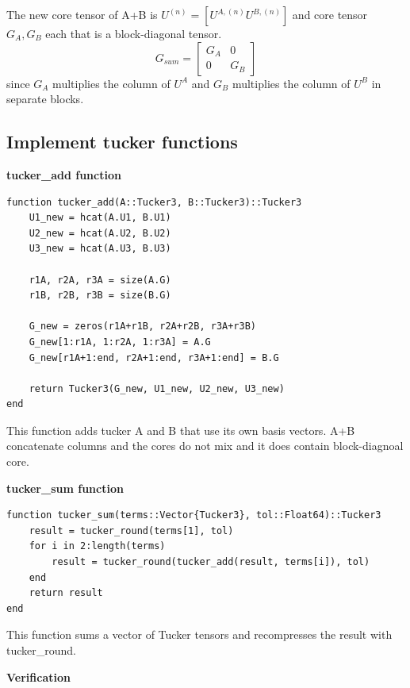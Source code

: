 \documentclass[11pt]{report}
\begin{document}
\vspace{1em}

The new core tensor of A+B is $U^{(n)} = [U^{A,(n)} U^{B, (n)}]$ and core tensor $G_A , G_B$ each that is a block-diagonal tensor.
\[
G_{sum}=\begin{bmatrix}
G_A&0\\0&G_B
\end{bmatrix}
\]
since $G_A$ multiplies the column of $U^A$ and $G_B$ multiplies the column of $U^B$ in separate blocks.

\vspace{1.5em}

\subsection{Implement tucker functions}

\textbf{tucker\_add function}

\begin{lstlisting}
function tucker_add(A::Tucker3, B::Tucker3)::Tucker3
    U1_new = hcat(A.U1, B.U1)   
    U2_new = hcat(A.U2, B.U2)
    U3_new = hcat(A.U3, B.U3)  

    r1A, r2A, r3A = size(A.G)
    r1B, r2B, r3B = size(B.G)

    G_new = zeros(r1A+r1B, r2A+r2B, r3A+r3B)
    G_new[1:r1A, 1:r2A, 1:r3A] = A.G
    G_new[r1A+1:end, r2A+1:end, r3A+1:end] = B.G

    return Tucker3(G_new, U1_new, U2_new, U3_new)
end
\end{lstlisting}

This function adds tucker A and B that use its own basis vectors. A+B concatenate columns and the cores do not mix and it does contain block-diagnoal core.

\textbf{tucker\_sum function}

\begin{lstlisting}
function tucker_sum(terms::Vector{Tucker3}, tol::Float64)::Tucker3
    result = tucker_round(terms[1], tol)
    for i in 2:length(terms)
        result = tucker_round(tucker_add(result, terms[i]), tol)
    end
    return result
end
\end{lstlisting}

This function sums a
vector of Tucker tensors and recompresses the result with tucker\_round.


\textbf{Verification}
\end{document}
